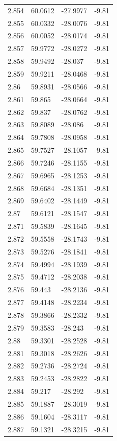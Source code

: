 \begin{tabular}{llll}
2.854 & 60.0612 & -27.9977 & -9.81 \\
2.855 & 60.0332 & -28.0076 & -9.81 \\
2.856 & 60.0052 & -28.0174 & -9.81 \\
2.857 & 59.9772 & -28.0272 & -9.81 \\
2.858 & 59.9492 & -28.037 & -9.81 \\
2.859 & 59.9211 & -28.0468 & -9.81 \\
2.86 & 59.8931 & -28.0566 & -9.81 \\
2.861 & 59.865 & -28.0664 & -9.81 \\
2.862 & 59.837 & -28.0762 & -9.81 \\
2.863 & 59.8089 & -28.086 & -9.81 \\
2.864 & 59.7808 & -28.0958 & -9.81 \\
2.865 & 59.7527 & -28.1057 & -9.81 \\
2.866 & 59.7246 & -28.1155 & -9.81 \\
2.867 & 59.6965 & -28.1253 & -9.81 \\
2.868 & 59.6684 & -28.1351 & -9.81 \\
2.869 & 59.6402 & -28.1449 & -9.81 \\
2.87 & 59.6121 & -28.1547 & -9.81 \\
2.871 & 59.5839 & -28.1645 & -9.81 \\
2.872 & 59.5558 & -28.1743 & -9.81 \\
2.873 & 59.5276 & -28.1841 & -9.81 \\
2.874 & 59.4994 & -28.1939 & -9.81 \\
2.875 & 59.4712 & -28.2038 & -9.81 \\
2.876 & 59.443 & -28.2136 & -9.81 \\
2.877 & 59.4148 & -28.2234 & -9.81 \\
2.878 & 59.3866 & -28.2332 & -9.81 \\
2.879 & 59.3583 & -28.243 & -9.81 \\
2.88 & 59.3301 & -28.2528 & -9.81 \\
2.881 & 59.3018 & -28.2626 & -9.81 \\
2.882 & 59.2736 & -28.2724 & -9.81 \\
2.883 & 59.2453 & -28.2822 & -9.81 \\
2.884 & 59.217 & -28.292 & -9.81 \\
2.885 & 59.1887 & -28.3019 & -9.81 \\
2.886 & 59.1604 & -28.3117 & -9.81 \\
2.887 & 59.1321 & -28.3215 & -9.81 \\

\end{tabular}
